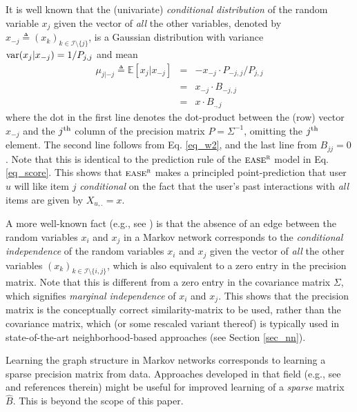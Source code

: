 \documentclass[sigconf]{acmart}
\newcommand{\sae}{${\textsc{ease}}^{\textsc{r}}$}
\newcommand{\W}{B}
\newcommand{\X}{X}
\newcommand{\EE}{\mathbb{E}}
\newcommand{\I}{\mathcal{ I}}
\newcommand{\Wzero}{\hat{\W}  }
\begin{document}
It is well known \cite{lauritzenbuch96,besag75} that the (univariate) \emph{conditional distribution} of the random variable $x_j$ given the vector of \emph{all} the other variables, denoted by  $x_{-j} \triangleq (x_k)_{k \in \I\setminus \{j\}}$, is  a Gaussian distribution with variance 
${\rm var}(x_j | x_{-j})=1/P_{j,j}$   
and mean 
\begin{eqnarray}
\mu_{j|-j} \triangleq  \EE[x_j|x_{-j}]&= &
- x_{-j}\cdot P_{-j,j} / P_{j,j}\nonumber\\
&=& x_{-j}\cdot \W_{-j,j} \nonumber\\
&=& x\cdot \W_{.,j}\nonumber
\end{eqnarray}
where the dot in the first line denotes the dot-product between the (row) vector $x_{-j}$ and the $j^{\rm th}$ column of the precision matrix $P=\Sigma^{-1}$, omitting the  $j^{\rm th}$ element.  The second line follows from Eq. \ref{eq_w2}, and the last line from  $\W_{jj}=0$.
Note that this is identical to the prediction rule of the \sae{}  model  in Eq. \ref{eq_score}. This shows that \sae{}  makes a principled point-prediction that  user $u$ will like item $j$ \emph{conditional} on the fact that the user's past interactions with \emph{all}   items are given by $\X_{u,.}=x$.


A more well-known fact   (e.g., see \cite{meinshausen06}) is that the absence of an edge between the random variables $x_i$ and $x_j$ in a Markov network corresponds to the \emph{conditional independence} of the random variables $x_i$ and $x_j$ given the vector of \emph{all} the other variables $(x_k)_{k \in \I\setminus \{i,j\}}$, which is also equivalent to a zero entry in the precision matrix. Note that this is different from a zero entry in the covariance matrix $\Sigma$, which signifies  \emph{marginal independence} of $x_i$ and $x_j$. This shows that the precision matrix is the conceptually correct similarity-matrix to be used, rather than the covariance matrix, which (or some rescaled variant thereof) is typically used in state-of-the-art  neighborhood-based approaches (see Section \ref{sec_nn}).

Learning the graph structure in Markov networks  corresponds to learning a sparse precision matrix from data. Approaches developed in that field (e.g., see \cite{schmidtthesis} and references therein) might be useful for improved learning of a \emph{sparse} matrix $\Wzero$. This is beyond the scope of this paper. 
\end{document}
